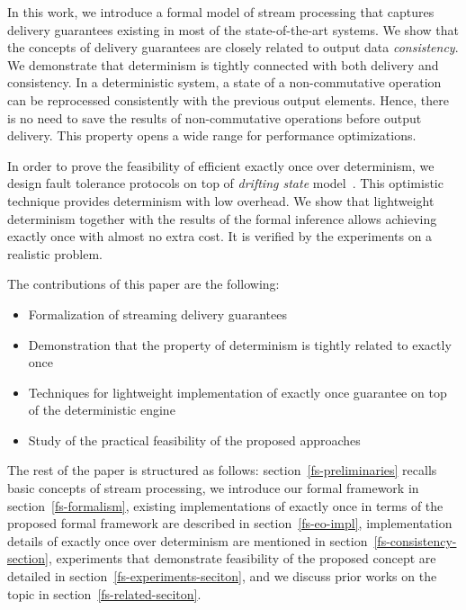 In this work, we introduce a formal model of stream processing that captures delivery guarantees existing in most of the state-of-the-art systems. We show that the concepts of delivery guarantees are closely related to output data {\em consistency}. We demonstrate that determinism is tightly connected with both delivery and consistency. In a deterministic system, a state of a non-commutative operation can be reprocessed consistently with the previous output elements. Hence, there is no need to save the results of non-commutative operations before output delivery. This property opens a wide range for performance optimizations.

In order to prove the feasibility of efficient exactly once over determinism, we design fault tolerance protocols on top of {\em drifting state} model~\cite{we2018adbis}. This optimistic technique provides determinism with low overhead. We show that lightweight determinism together with the results of the formal inference allows achieving exactly once with almost no extra cost. It is verified by the experiments on a realistic problem.

The contributions of this paper are the following: 
\begin{itemize}
    \item Formalization of streaming delivery guarantees 
    \item Demonstration that the property of determinism is tightly related to exactly once
    \item Techniques for lightweight implementation of exactly once guarantee on top of the deterministic engine
    \item Study of the practical feasibility of the proposed approaches
\end{itemize}

The rest of the paper is structured as follows: section~\ref{fs-preliminaries} recalls basic concepts of stream processing, we introduce our formal framework in section~\ref{fs-formalism}, existing implementations of exactly once in terms of the proposed formal framework are described in section~\ref{fs-eo-impl}, implementation details of exactly once over determinism are mentioned in section~\ref{fs-consistency-section}, experiments that demonstrate feasibility of the proposed concept are detailed in section~\ref{fs-experiments-seciton}, and we discuss prior works on the topic in section~\ref{fs-related-seciton}. 
